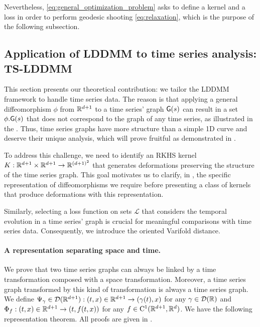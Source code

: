 
Nevertheless, \eqref{eq:general_optimization_problem} asks to define a kernel and a loss in order to perform geodesic shooting \eqref{eq:relaxation}, which is the purpose of the following subsection.
\vspace{-1ex}
   \subsection{Application of LDDMM to time series analysis: TS-LDDMM}
   \vspace{-1ex}

        \label{section:time_series_specificity}
        This section presents our theoretical contribution: we tailor the LDDMM framework to handle time series data.
        The reason is that applying a general diffeomorphism $\phi$ from $\mathbb{R}^{d+1}$ to a time series' graph $\mathsf{G}(s)$ can result in a set $\phi.\mathsf{G}(s)$ that does not correspond to the graph of any time series, as illustrated in the .
        Thus, time series graphs have more structure than a simple 1D curve \cite{glaunes2008large} and deserve their unique analysis, which will prove fruitful as demonstrated in .
       
       To address this challenge, we need to identify an RKHS kernel $K:\mathbb{R}^{d+1}\times \mathbb{R}^{d+1}\to \mathbb{R}^{(d+1)^2}$ that generates deformations preserving the structure of the time series graph. This goal motivates us to clarify, in , the specific representation of diffeomorphisms we require before presenting a class of kernels that produce deformations with this representation.
       
       Similarly, selecting a loss function on sets $\mathscr{L}$ that considers the temporal evolution in a time series' graph is crucial for meaningful comparisons with time series data. Consequently, we introduce the oriented Varifold distance. 
\vspace{-1ex}
       \paragraph{A representation separating space and time.}
       We prove that two time series graphs can always be linked by a time transformation composed with a space transformation. Moreover, a time series graph transformed by this kind of transformation is always a time series graph.
        We define $\Psi_\gamma\in \mathcal{D}(\mathbb{R}^{d+1}) : (t,x)\in\mathbb{R}^{d+1}\to (\gamma(t),x)$ for any $\gamma\in \mathcal{D}(\mathbb{R})$ and $\Phi_f:  (t,x)\in\mathbb{R}^{d+1}\to (t,f(t,x)) $ for any $f\in \mathrm{C}^1(\mathbb{R}^{d+1},\mathbb{R}^d)$. 
        We have the following representation theorem.
        All proofs are given in . 


